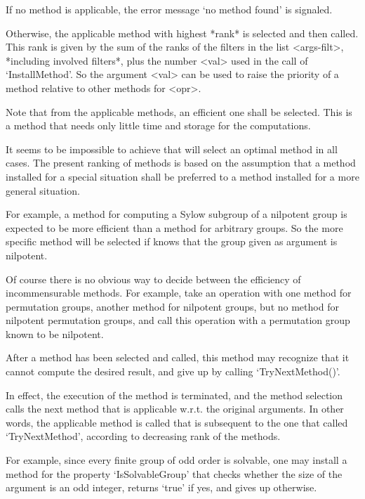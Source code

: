If no method is applicable,
the error message `no method found' is signaled.

Otherwise, the applicable method with highest *rank* is selected and then
called.
This rank is given by the sum of the ranks of the filters in the list
<args-filt>,
*including involved filters*,
plus the number <val> used in the call of `InstallMethod'.
So the argument <val> can be used to raise the priority of a method
relative to other methods for <opr>.

Note that from the applicable methods,
an efficient one shall be selected.
This is a method that needs only little time and storage for the
computations.

It seems to be impossible to achieve that {\GAP} will select an optimal
method in all cases.
The present ranking of methods is based on the assumption
that a method installed for a special situation shall be preferred
to a method installed for a more general situation.

For example, a method for computing a Sylow subgroup of a nilpotent
group is expected to be more efficient than a method for arbitrary
groups.
So the more specific method will be selected if {\GAP} knows that the
group given as argument is nilpotent.

Of course there is no obvious way to decide between the efficiency of
incommensurable methods.
For example, take an operation with one method for permutation groups,
another method for nilpotent groups,
but no method for nilpotent permutation groups,
and call this operation with a permutation group known to be
nilpotent.


After a method has been selected and called,
this method may recognize that it cannot compute the desired result,
and give up by calling `TryNextMethod()'.

In effect, the execution of the method is terminated,
and the method selection calls the next method that is applicable w.r.t.
the original arguments.
In other words, the applicable method is called that is subsequent to the
one that called `TryNextMethod',
according to decreasing rank of the methods.

For example, since every finite group of odd order is solvable,
one may install a method for the property `IsSolvableGroup' that checks
whether the size of the argument is an odd integer,
returns `true' if yes,
and gives up otherwise.

